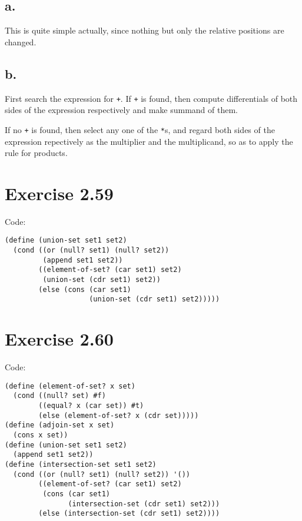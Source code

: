 \documentclass[../main.tex]{subfiles}
\begin{document}
\subsection{a.}

This is quite simple actually, since
 nothing but only the relative positions
 are changed.

\subsection{b.}

First search the expression for \lstinline{+}.
 If \lstinline{+} is found, then compute
 differentials of both sides of the expression
 respectively and make summand of them.

If no \lstinline{+} is found, then select any
 one of the \lstinline{*}s, and regard both sides
 of the expression repectively as the multiplier
 and the multiplicand, so as to apply the rule
 for products.

\section{Exercise 2.59}

Code:

\begin{lstlisting}
(define (union-set set1 set2)
  (cond ((or (null? set1) (null? set2))
         (append set1 set2))
        ((element-of-set? (car set1) set2)
         (union-set (cdr set1) set2))
        (else (cons (car set1)
                    (union-set (cdr set1) set2)))))
\end{lstlisting}

\section{Exercise 2.60}

Code:

\begin{lstlisting}
(define (element-of-set? x set)
  (cond ((null? set) #f)
        ((equal? x (car set)) #t)
        (else (element-of-set? x (cdr set)))))
(define (adjoin-set x set)
  (cons x set))
(define (union-set set1 set2)
  (append set1 set2))
(define (intersection-set set1 set2)
  (cond ((or (null? set1) (null? set2)) '())
        ((element-of-set? (car set1) set2)
         (cons (car set1)
               (intersection-set (cdr set1) set2)))
        (else (intersection-set (cdr set1) set2))))
\end{lstlisting}
\end{document}
